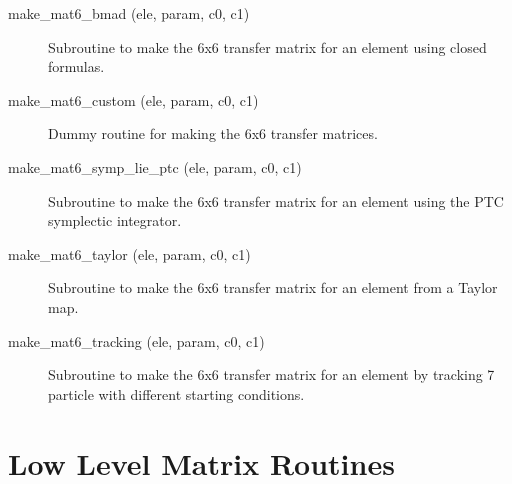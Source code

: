 \begin{description}

\item[make\_mat6\_bmad (ele, param, c0, c1)] \Newline
Subroutine to make the 6x6 transfer matrix for an element
using closed formulas.

\item[make\_mat6\_custom (ele, param, c0, c1)] \Newline
Dummy routine for making the 6x6 transfer matrices.

\item[make\_mat6\_symp\_lie\_ptc (ele, param, c0, c1)] \Newline
Subroutine to make the 6x6 transfer matrix for an element using
the PTC symplectic integrator.

\item[make\_mat6\_taylor (ele, param, c0, c1)] \Newline
Subroutine to make the 6x6 transfer matrix for an element
from a Taylor map.

\item[make\_mat6\_tracking (ele, param, c0, c1)] \Newline
Subroutine to make the 6x6 transfer matrix for an element by 
tracking 7 particle with different starting conditions.

\end{description}

\section{Low Level Matrix Routines}
\label{r:low_mat}  

